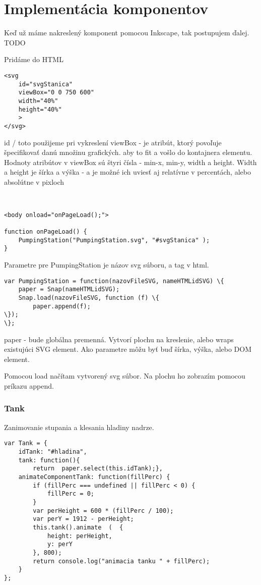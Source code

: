 \chapter{Implementácia komponentov}

Keď už máme nakreslený komponent pomocou Inkscape, tak postupujem ďalej. TODO

Pridáme do HTML  
\begin{lstlisting}
<svg  
	id="svgStanica"  
	viewBox="0 0 750 600" 
	width="40%" 
	height="40%" 
	>
</svg>
\end{lstlisting}


id / toto použijeme pri vykreslení 
viewBox - je atribút, ktorý povoľuje špecifikovať danú množinu grafických. aby to fit a vošlo do kontajnera elementu. Hodnoty atribútov v viewBox sú štyri čísla - min-x, min-y, width a height. 
Width a height je šírka a výška - a je možné ich uviesť aj relatívne v percentách, alebo absolútne v pixloch 

\begin{lstlisting}


<body onload="onPageLoad();">

function onPageLoad() {
	PumpingStation("PumpingStation.svg", "#svgStanica" );
}
\end{lstlisting}
Parametre pre PumpingStation je názov svg súboru, a tag v html.
\begin{lstlisting}
var PumpingStation = function(nazovFileSVG, nameHTMLidSVG) \{
	paper = Snap(nameHTMLidSVG);
	Snap.load(nazovFileSVG, function (f) \{
		paper.append(f);
\});
\};
\end{lstlisting}
paper - bude globálna premenná. Vytvorí plochu na  kreslenie, alebo  wraps existujúci SVG element. Ako parametre môžu byť buď šírka, výška, alebo DOM element. 

Pomocou load načítam vytvorený svg súbor. Na plochu ho zobrazím pomocou príkazu append. 

\subsection{Tank}
Zanimovanie stupania a klesania hladiny nadrze. 
\begin{lstlisting}
var Tank = {
	idTank: "#hladina",
	tank: function(){
		return  paper.select(this.idTank);},
	animateComponentTank: function(fillPerc) {
		if (fillPerc === undefined || fillPerc < 0) {
			fillPerc = 0;
		}
		var perHeight = 600 * (fillPerc / 100);
		var perY = 1912 - perHeight;
		this.tank().animate  (	{
			height: perHeight,
			y: perY
		}, 800);
		return console.log("animacia tanku " + fillPerc);
	}
};
\end{lstlisting}

